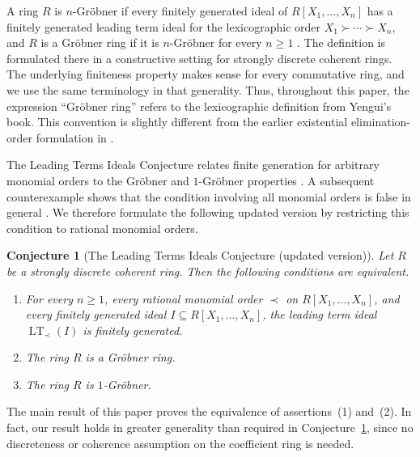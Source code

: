 \documentclass[preprint,12pt,3p]{elsarticle}
\newtheorem{conjecture}[theorem]{Conjecture}
\theoremstyle{definition}
\theoremstyle{remark}
\newcommand{\LT}{\operatorname{LT}}
\begin{document}
	A ring $R$ is
	$n$-Gr\"obner if every finitely generated ideal of
	$R[X_1,\ldots,X_n]$ has a finitely generated leading term ideal for
	the lexicographic order $X_1\succ\cdots\succ X_n$, and $R$ is a
	Gr\"obner ring if it is $n$-Gr\"obner for every $n\geq 1$
	\cite[Definition~215]{Yengui2015Book}. The definition is formulated
	there in a constructive setting for strongly discrete coherent
	rings. The underlying finiteness property makes sense for every
	commutative ring, and we use the same terminology in that generality.
	Thus, throughout this paper, the expression ``Gr\"obner ring'' refers
	to the lexicographic definition from Yengui's book. This convention
	is slightly different from the earlier existential elimination-order
	formulation in \cite{PolaYengui2014}.
	
	The Leading Terms Ideals Conjecture relates finite generation for
	arbitrary monomial orders to the Gr\"obner and $1$-Gr\"obner
	properties \cite[Conjecture~225]{Yengui2015Book}. A subsequent
	counterexample shows that the condition involving all monomial
	orders is false in general \cite{Yengui2021Counterexample}. We
	therefore formulate the following updated version by restricting
	this condition to rational monomial orders.
	
	\begin{conjecture}[The Leading Terms Ideals Conjecture
		(updated version)]
		\label{conj:updated-leading-terms}
		Let $R$ be a strongly discrete coherent ring. Then the following
		conditions are equivalent.
		\begin{enumerate}
			\item[(1)] For every $n\geq 1$, every rational monomial order
			$\prec$ on $R[X_1,\ldots,X_n]$, and every finitely generated
			ideal $I\subseteq R[X_1,\ldots,X_n]$, the leading term ideal
			$\LT_\prec(I)$ is finitely generated.
			
			\item[(2)] The ring $R$ is a Gr\"obner ring.
			
			\item[(3)] The ring $R$ is $1$-Gr\"obner.
		\end{enumerate}
	\end{conjecture}
	
	The main result of this paper proves the equivalence of
	assertions~{\rm(1)} and~{\rm(2)}. In fact, our result holds in
	greater generality than required in
	Conjecture~\ref{conj:updated-leading-terms}, since no discreteness
	or coherence assumption on the coefficient ring is needed.
	
\end{document}
